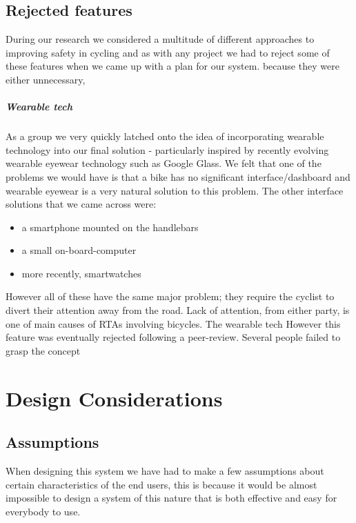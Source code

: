 \documentclass[]{report}
\begin{document}
\section{Rejected features}
During our research we considered a multitude of different approaches to improving safety in cycling and as with any project we had to reject some of these features when we came up with a plan for our system. because they were either unnecessary, 



\paragraph{Wearable tech}As a group we very quickly latched onto the idea of incorporating wearable technology into our final solution - particularly inspired by recently evolving wearable eyewear technology such as Google Glass. We felt that one of the problems we would have is that a bike has no significant interface/dashboard and wearable eyewear is a very natural solution to this problem. The other interface solutions that we came across were: 
\begin{itemize}
  \item a smartphone mounted on the handlebars
  \item a small on-board-computer
  \item more recently, smartwatches
\end{itemize}
However all of these have the same major problem; they require the cyclist to divert their attention away from the road. Lack of attention, from either party, is one of main causes of RTAs involving bicycles. %
The wearable tech However this feature was eventually rejected following a peer-review. Several people failed to grasp the concept

\chapter{Design Considerations}
\section{Assumptions}
When designing this system we have had to make a few assumptions about certain characteristics of the end users, this is because it would be almost impossible to design a system of this nature that is both effective and easy for everybody to use. 
\end{document}
